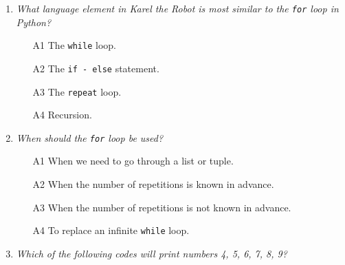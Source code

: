 \begin{enumerate}

\item {\em What language element in Karel the Robot is most similar to the {\tt for} loop in Python?}\\

\begin{enumerate}
\item[A1] The {\tt while} loop.
\item[A2] The {\tt if - else} statement.
\item[A3] The {\tt repeat} loop.
\item[A4] Recursion.
\end{enumerate}

\vspace{6mm}

\item {\em When should the {\tt for} loop be used?}\\

\begin{enumerate}
\item[A1] When we need to go through a list or tuple.
\item[A2] When the number of repetitions is known in advance. 
\item[A3] When the number of repetitions is not known in advance. 
\item[A4] To replace an infinite {\tt while} loop.
\end{enumerate}

\vspace{6mm}

\item {\em Which of the following codes will print numbers 4, 5, 6, 7, 8, 9?}\\


\end{enumerate}
